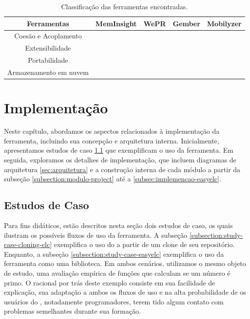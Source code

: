 \documentclass[12pt]{tcc}
\newcommand{\cmark}{\ding{51}}
\newcommand{\xmark}{\ding{55}}
\begin{document}
	\begin{table}[ht]
	\caption{Classificação das ferramentas encontradas.} %
	\centering %
	\begin{tabular}{c c c c c } %
	\toprule %

	\textbf{Ferramentas} &\textbf{MemInsight} & \textbf{WePR} & \textbf{Gember} & \textbf{Mobilyzer}  \\ [0.4ex]

	\midrule %
	Coesão e Acoplamento & \cmark & \cmark & \cmark & \cmark   \\
	Extensibilidade & \xmark & \xmark & \xmark & \xmark  \\
	Portabilidade & \cmark & \xmark & \xmark & \xmark  \\
	Armazenamento em nuvem & \xmark & \cmark & \cmark & \cmark  \\
	\bottomrule %
	\end{tabular}
	\label{table:classificacao-sem-elc} %
	\end{table}
\chapter{Implementação}
	\label{cap:implementação}


	Neste capítulo, abordamos os aspectos relacionados à implementação da ferramenta, incluindo sua concepção e arquitetura interna.
	Inicialmente, apresentamos estudos de caso \ref{sec:estudos-de-caso} que exemplificam o uso da ferramenta.
	Em seguida, exploramos os detalhes de implementação, que incluem diagramas de arquitetura \ref{sec:arquitetura} e a construção interna de cada módulo a partir da subseção \ref{subsection:modulo-project} até a \ref{subsec:implemencao-easyelc}.

	\section{Estudos de Caso}
	\label{sec:estudos-de-caso}

	Para fins didáticos, estão descritos nesta seção dois estudos de caso, os quais ilustram os possíveis fluxos de uso da ferramenta.
	A subseção \ref{subsection:study-case-cloning-elc} exemplifica o uso do  a partir de um clone de seu repositório.
	Enquanto, a subseção \ref{subsection:study-case-easyelc} exemplifica o uso da ferramenta como uma biblioteca. 
	Em ambos cenários, utilizamos o mesmo objeto de estudo, uma avaliação empírica de funções que calculam se um número é primo.
	O racional por trás deste exemplo consiste em sua facilidade de explicação, sua adaptação a ambos os fluxos de uso e na alta probabilidade de os usuários do , notadamente programadores, terem tido algum contato com problemas semelhantes durante sua formação.
\end{document}
